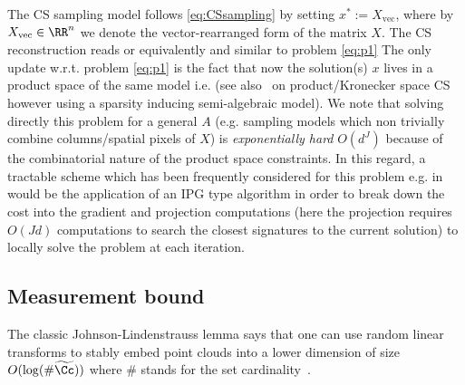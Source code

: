 The CS sampling model follows \eqref{eq:CSsampling} by setting $x^*:=X_\text{vec}$, where by $X_\text{vec}\in \RR^n$ we denote the vector-rearranged form of the matrix $X$.
The CS reconstruction reads
or equivalently and similar to problem \eqref{eq:p1} 
The only update w.r.t. problem \eqref{eq:p1} 
is the fact that now the solution(s) $x$ lives in a product space of the same model i.e. 
(see also~\cite{kronCS} on product/Kronecker space CS however using a sparsity inducing semi-algebraic model). We note that solving directly this problem for a general $A$ (e.g. sampling models which non trivially combine columns/spatial pixels of $X$)  is \emph{exponentially hard} $O(d^J)$ because of the combinatorial nature of the product space constraints. In this regard, a tractable scheme which has been frequently considered for this problem e.g. in \cite{BLIPsiam} would be the application of an IPG type algorithm 
in order to break down the cost into the gradient and projection computations (here the projection requires $O(Jd)$ computations to search the closest signatures  to the current solution) to locally solve the problem at each iteration. 




\subsection{Measurement bound}
The classic Johnson-Lindenstrauss lemma says that one can use random linear transforms to stably embed point clouds into a lower dimension of size $O(\log(\#\widetilde \Cc))$ where $\#$ stands for the set cardinality~\cite{JL}.
{}
		
